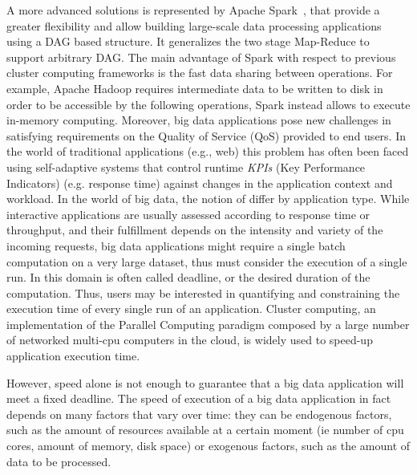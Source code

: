 A more advanced solutions is represented by Apache Spark~\cite{misc:ApacheSpark}, that provide a greater flexibility and allow building large-scale data processing applications using a DAG based structure. It generalizes the two stage Map-Reduce to support arbitrary DAG. The main advantage of Spark with respect to previous cluster computing frameworks is the fast data sharing between operations. For example, Apache Hadoop requires intermediate data to be written to disk in order to be accessible by the following operations, Spark instead allows to execute in-memory computing. Moreover, big data applications pose new challenges in satisfying requirements on the Quality of Service (QoS) provided to end users. 
In the world of traditional applications (e.g., web) this problem has often been faced using self-adaptive systems that control runtime \textit{KPIs} (Key Performance Indicators) (e.g.  response time) against changes in the application context and workload. In the world of big data, the notion of \qos differ by application type. While interactive applications are usually assessed according to response time or throughput, and their fulfillment depends on the intensity and variety of the incoming requests,  big data applications might require a single batch computation on a very large dataset, thus \qos must consider the execution of a single run. In this domain \qos is often called deadline, or the desired duration of the computation. Thus, users may be interested in quantifying and constraining the execution time of every single run of an application. Cluster computing, an implementation of the Parallel Computing paradigm composed by a large number of networked multi-cpu computers in the cloud, is widely used to speed-up application execution time. 

However, speed alone is not enough to guarantee that a big data application will meet a fixed deadline. The speed of execution of a big data application in fact depends on many factors that vary over time: they can be endogenous factors, such as the amount of resources available at a certain moment (ie number of cpu cores, amount of memory, disk space) or exogenous factors, such as the amount of data to be processed.

